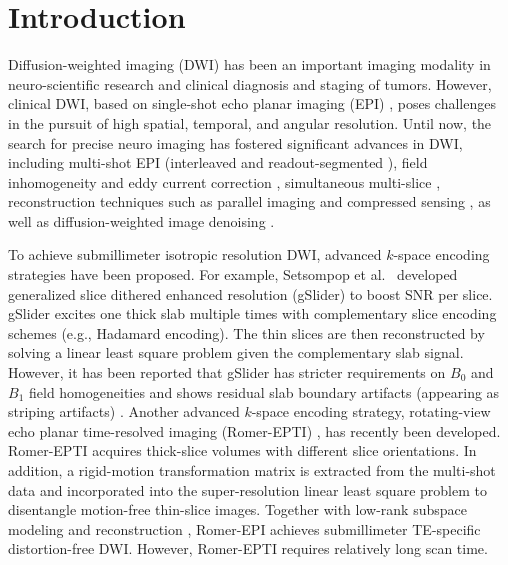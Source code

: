 \documentclass[AMA,STIX2COL,Linenumberson]{MRM}
\begin{document}

\section{Introduction}\label{SEC:INTRO}

Diffusion-weighted imaging (DWI) \cite{jones_2010_diff} 
has been an important imaging modality in neuro-scientific research and clinical diagnosis and staging of tumors. 
However, clinical DWI, based on single-shot echo planar imaging (EPI) 
\cite{mansfield_1977_epi}, poses challenges in the pursuit of
high spatial, temporal, and angular resolution.
Until now, the search for precise neuro imaging has fostered significant advances in DWI, 
including multi-shot EPI (interleaved \cite{butts_1993_iepi,liu_2004_diff_spiral,chen_2013_muse} and 
readout-segmented \cite{porter_2009_resolve,heidemann_2010_resolve7t}), 
field inhomogeneity and eddy current correction \cite{andersson_2003_topup},
simultaneous multi-slice \cite{setsompop_2012_blipped}, reconstruction techniques such as parallel imaging 
\cite{pruessmann_1999_sense,griswold_2002_grappa,bammer_2001_epi_sense} and compressed sensing 
\cite{lustig_2007_cs,mani_2017_mussels, hu_2020_spa_llr}, as well as 
diffusion-weighted image denoising \cite{veraart_2016_denoise,tian_2023_sdndti}. 

To achieve submillimeter isotropic resolution DWI, advanced $k$-space encoding strategies have been proposed.
For example, Setsompop et al.~\cite{setsompop_2018_gslider} developed 
generalized slice dithered enhanced resolution (gSlider) to boost SNR per slice. 
gSlider excites one thick slab multiple times with 
complementary slice encoding schemes (e.g., Hadamard encoding). 
The thin slices are then reconstructed by solving a linear least square problem 
given the complementary slab signal. 
However, it has been reported that gSlider has stricter requirements
on $B_0$ and $B_1$ field homogeneities
and shows residual slab boundary artifacts (appearing as striping artifacts)
\cite{dai_2021_smslab}.
Another advanced $k$-space encoding strategy, 
rotating-view echo planar time-resolved imaging (Romer-EPTI) 
\cite{dong_2024_romer-epti}, has recently been developed. 
Romer-EPTI acquires thick-slice volumes with different slice orientations. 
In addition, a rigid-motion transformation matrix is extracted from the multi-shot data 
and incorporated into the super-resolution linear least square problem 
to disentangle motion-free thin-slice images. 
Together with low-rank subspace modeling and reconstruction 
\cite{liang_2007_psf,zhang_2015_llr,dong_2020_epti_sub}, 
Romer-EPI achieves submillimeter TE-specific distortion-free DWI.
However, Romer-EPTI requires relatively long scan time.
\end{document}
